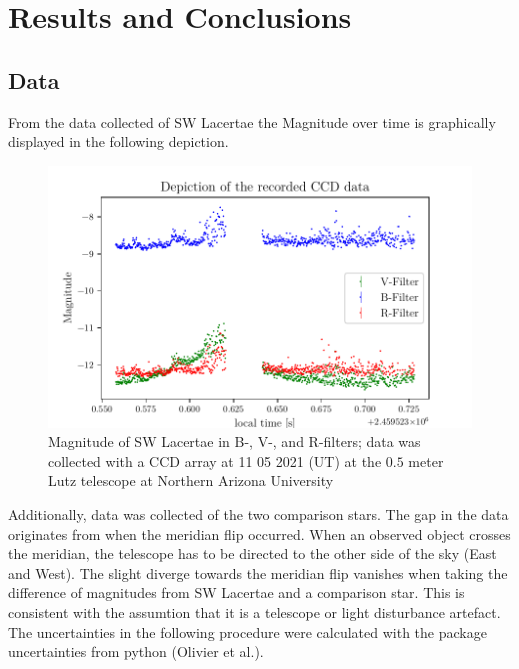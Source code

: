 \section{Results and Conclusions}
\label{sec:make}

\subsection{Data}
  \label{sec:America}
  From the data collected of SW Lacertae the Magnitude over time is graphically displayed in the following depiction.
  \begin{figure}[H]
    \centering
    \includegraphics{Magnitude.pdf}
    \caption{Magnitude of SW Lacertae in B-, V-, and R-filters; 
    data was collected with a CCD array at 11 05 2021 (UT) at the $0.5$ meter Lutz telescope
    at Northern Arizona University}
  \end{figure}
  \noindent Additionally, data was collected of the two comparison stars. The gap in the data originates from when
  the meridian flip occurred. When an observed object crosses the meridian, the telescope has to be directed 
  to the other side of the sky (East and West). The slight diverge towards the meridian flip vanishes when taking the 
  difference of magnitudes from SW Lacertae and a comparison star. This is consistent with the 
  assumtion that it is a telescope or light disturbance artefact.\\
  \noindent The uncertainties in the following procedure were calculated with the package 
  uncertainties from python (Olivier et al.).
  
